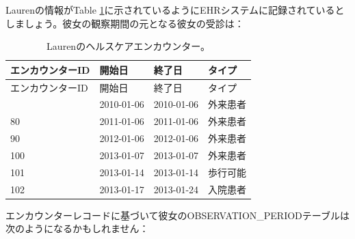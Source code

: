 \documentclass[
  11pt]{book}
\theoremstyle{definition}
\theoremstyle{definition}
\theoremstyle{definition}
\theoremstyle{definition}
\theoremstyle{remark}
\begin{document}
Laurenの情報がTable \ref{tab:encounters}に示されているようにEHRシステムに記録されているとしましょう。彼女の観察期間の元となる彼女の受診は：

\begin{longtable}[]{@{}llll@{}}
\caption{\label{tab:encounters} Laurenのヘルスケアエンカウンター。}\tabularnewline
\toprule\noalign{}
エンカウンターID & 開始日 & 終了日 & タイプ \\
\midrule\noalign{}
\endfirsthead
\toprule\noalign{}
エンカウンターID & 開始日 & 終了日 & タイプ \\
\midrule\noalign{}
\endhead
\bottomrule\noalign{}
\endlastfoot
70 & 2010-01-06 & 2010-01-06 & 外来患者 \\
80 & 2011-01-06 & 2011-01-06 & 外来患者 \\
90 & 2012-01-06 & 2012-01-06 & 外来患者 \\
100 & 2013-01-07 & 2013-01-07 & 外来患者 \\
101 & 2013-01-14 & 2013-01-14 & 歩行可能 \\
102 & 2013-01-17 & 2013-01-24 & 入院患者 \\
\end{longtable}

エンカウンターレコードに基づいて彼女のOBSERVATION\_PERIODテーブルは次のようになるかもしれません：
\end{document}
